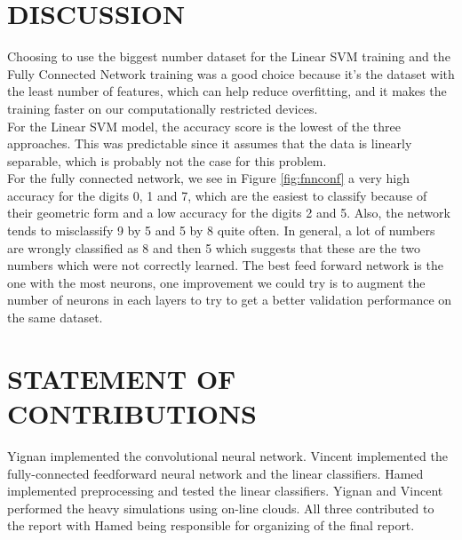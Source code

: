 \documentclass[letterpaper, 10 pt, conference]{ieeeconf}  %
\begin{document}
\section{DISCUSSION}

Choosing to use the biggest number dataset for the Linear SVM training and the Fully Connected Network training was a good choice because it's the dataset with the least number of features, which can help reduce overfitting, and it makes the training faster on our computationally restricted devices. \\
For the Linear SVM model, the accuracy score is the lowest of the three approaches. This was predictable since it assumes that the data is linearly separable, which is probably not the case for this problem.\\
For the fully connected network, we see in Figure \ref{fig:fnnconf} a very high accuracy for the digits 0, 1 and 7, which are the easiest to classify because of their geometric form and a low accuracy for the digits 2 and 5. Also, the network tends to misclassify 9 by 5 and 5 by 8 quite often. In general, a lot of numbers are wrongly classified as 8 and then 5 which suggests that these are the two numbers which were not correctly learned.
The best feed forward network is the one with the most neurons, one improvement we could try is to augment the number of neurons in each layers to try to get a better validation performance on the same dataset. \\



\addtolength{\textheight}{-12cm}   %






\section*{STATEMENT OF CONTRIBUTIONS}
Yignan implemented the convolutional neural network.
Vincent implemented the fully-connected feedforward neural
network and the linear classifiers. Hamed implemented preprocessing and tested the linear classifiers. Yignan and Vincent performed the heavy simulations using on-line clouds. All three contributed to the report with Hamed being responsible for organizing of the final report.
\end{document}
